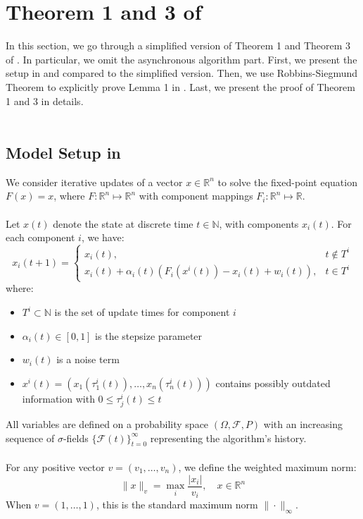\section{Theorem 1 and 3 of \cite{tsitsiklis1994asynchronous}}

In this section, we go through a simplified version of Theorem 1 and Theorem 3 of \cite{tsitsiklis1994asynchronous}. In particular, we omit the asynchronous algorithm part. First, we present the setup in \cite{tsitsiklis1994asynchronous} and compared to the simplified version. Then, we use Robbins-Siegmund Theorem to explicitly prove Lemma 1 in \cite{tsitsiklis1994asynchronous}. Last, we present the proof of Theorem 1 and 3 in details.\\
\\
\subsection{Model Setup in \cite{tsitsiklis1994asynchronous}}

We consider iterative updates of a vector $x \in \mathbb{R}^n$ to solve the fixed-point equation $F(x) = x$, where $F: \mathbb{R}^n \mapsto \mathbb{R}^n$ with component mappings $F_i: \mathbb{R}^n \mapsto \mathbb{R}$.\\
\\
Let $x(t)$ denote the state at discrete time $t \in \mathbb{N}$, with components $x_i(t)$. For each component $i$, we have:
\begin{equation}\label{eq:update_rule_tsi}
x_i(t + 1) = 
\begin{cases}
x_i(t), & t \notin T^i \\
x_i(t) + \alpha_i(t)(F_i(x^i(t)) - x_i(t) + w_i(t)), & t \in T^i
\end{cases}
\end{equation}
where:
\begin{itemize}
\item $T^i \subset \mathbb{N}$ is the set of update times for component $i$
\item $\alpha_i(t) \in [0,1]$ is the stepsize parameter
\item $w_i(t)$ is a noise term
\item $x^i(t) = (x_1(\tau_1^i(t)), \ldots, x_n(\tau_n^i(t)))$ contains possibly outdated information with $0 \leq \tau_j^i(t) \leq t$
\end{itemize}
All variables are defined on a probability space $(\Omega, \mathcal{F}, P)$ with an increasing sequence of $\sigma$-fields $\{\mathcal{F}(t)\}_{t=0}^{\infty}$ representing the algorithm's history.\\
\\
For any positive vector $v = (v_1, \ldots, v_n)$, we define the weighted maximum norm:
\begin{equation*}
\|x\|_v = \max_i \frac{|x_i|}{v_i}, \quad x \in \mathbb{R}^n
\end{equation*}
When $v = (1,\ldots,1)$, this is the standard maximum norm $\|\cdot\|_{\infty}$.
